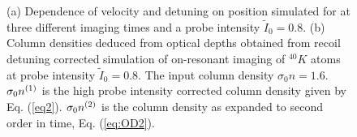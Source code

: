 \documentclass[12pt]{iopart}
\begin{document}
\begin{figure}
\caption{(a) Dependence of velocity and detuning on position simulated for \K{} at three different imaging times and a probe intensity $\tilde{I}_0=0.8$. (b) Column densities deduced from optical depths obtained from recoil detuning corrected simulation of on-resonant imaging of $^{40}K$ atoms at probe intensity $\tilde{I}_0=0.8$. The input column density $\sigma_0 n=1.6$. $\sigma_0 n^{\rm{(1)}}$ is the high probe intensity corrected column density given by Eq. (\ref{eq2}). $\sigma_0 n^{\rm{(2)}}$ is the column density as expanded to second order in time, Eq. (\ref{eq:OD2}).}
\label{fig:expos}
\end{figure}
\end{document}
